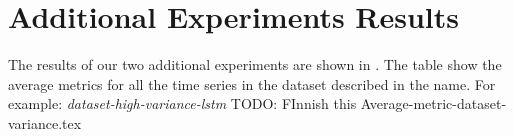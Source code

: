 \section{Additional Experiments Results}
The results of our two additional experiments are shown in .
The table show the average metrics for all the time series in the dataset described in the name.
For example: \textit{dataset-high-variance-lstm}
TODO: FInnish this
{Average-metric-dataset-variance.tex}



